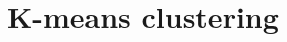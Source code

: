 %

\chapter{K-means clustering}
\label{chapter:kmeans}






%

\begin{comment}

 

\appendix

\end{comment}
\begin{comment}



\end{comment}



